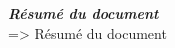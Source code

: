 \thispagestyle{empty}
\vspace*{10mm}

\textbf{\emph{\textcolor{epiBlue}{\large{Résumé du document} } } }\\

=> Résumé du document

\clearpage
